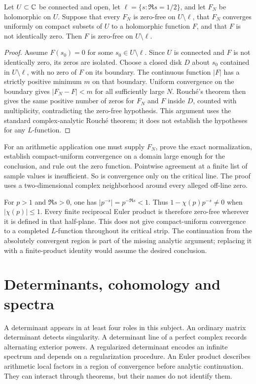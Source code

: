 \begin{proposition}
Let $U\subset\mathbb{C}$ be connected and open, let $\ell=\{s:\Re s=1/2\}$, and let $F_N$ be holomorphic on $U$. Suppose that every $F_N$ is zero-free on $U\setminus\ell$, that $F_N$ converges uniformly on compact subsets of $U$ to a holomorphic function $F$, and that $F$ is not identically zero. Then $F$ is zero-free on $U\setminus\ell$.
\end{proposition}
\begin{proof}
Assume $F(s_0)=0$ for some $s_0\in U\setminus\ell$. Since $U$ is connected and $F$ is not identically zero, its zeros are isolated. Choose a closed disk $D$ about $s_0$ contained in $U\setminus\ell$, with no zero of $F$ on its boundary. The continuous function $|F|$ has a strictly positive minimum $m$ on that boundary. Uniform convergence on the boundary gives $|F_N-F|<m$ for all sufficiently large $N$. Rouch\'e's theorem then gives the same positive number of zeros for $F_N$ and $F$ inside $D$, counted with multiplicity, contradicting the zero-free hypothesis. This argument uses the standard complex-analytic Rouch\'e theorem; it does not establish the hypotheses for any $L$-function.
\end{proof}

For an arithmetic application one must supply $F_N$, prove the exact normalization, establish compact-uniform convergence on a domain large enough for the conclusion, and rule out the zero function. Pointwise agreement at a finite list of sample values is insufficient. So is convergence only on the critical line. The proof uses a two-dimensional complex neighborhood around every alleged off-line zero.

\begin{example}
For $p>1$ and $\Re s>0$, one has
$|p^{-s}|=p^{-\Re s}<1$. Thus $1-\chi(p)p^{-s}\ne0$ when $|\chi(p)|\le1$. Every finite reciprocal Euler product is therefore zero-free wherever it is defined in that half-plane. This does not give compact-uniform convergence to a completed $L$-function throughout its critical strip. The continuation from the absolutely convergent region is part of the missing analytic argument; replacing it with a finite-product identity would assume the desired conclusion.
\end{example}

\section{Determinants, cohomology and spectra}
A determinant appears in at least four roles in this subject. An ordinary matrix determinant detects singularity. A determinant line of a perfect complex records alternating exterior powers. A regularized determinant encodes an infinite spectrum and depends on a regularization procedure. An Euler product describes arithmetic local factors in a region of convergence before analytic continuation. They can interact through theorems, but their names do not identify them.

